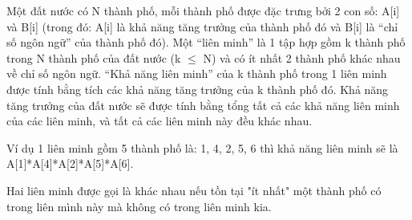Một đất nước có N thành phố, mỗi thành phố được đặc trưng bởi 2 con số: A[i] và B[i] (trong đó: A[i] là khả năng tăng trưởng của thành phố đó và B[i] là “chỉ số ngôn ngữ” của thành phố đó). Một “liên minh” là 1 tập hợp gồm k thành phố trong N thành phố của đất nước (k  $\le$  N) và có ít nhất 2 thành phố khác nhau về chỉ số ngôn ngữ. “Khả năng liên minh” của k thành phố trong 1 liên minh được tính bằng tích các khả năng tăng trưởng của k thành phố đó. Khả năng tăng trưởng của đất nước sẽ được tính bằng tổng tất cả các khả năng liên minh của các liên minh, và tất cả các liên minh này đều khác nhau.   



    Ví dụ 1 liên minh gồm 5 thành phố là: 1, 4, 2, 5, 6 thì khả năng liên minh sẽ là A[1]*A[4]*A[2]*A[5]*A[6].   



    Hai liên minh được gọi là khác nhau nếu tồn tại "ít nhất" một thành phố có trong liên mình này mà không có trong liên minh kia.